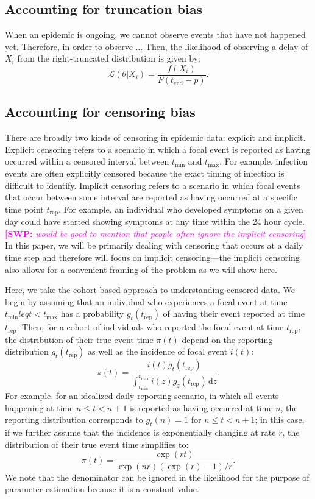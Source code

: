 \documentclass[12pt]{article}
\newcommand{\comment}{\showcomment}
\newcommand{\showcomment}[3]{\textcolor{#1}{\textbf{[#2: }\textsl{#3}\textbf{]}}}
\newcommand{\swp}[1]{\comment{magenta}{SWP}{#1}}
\newcommand{\dd}[1]{\ensuremath{\, \mathrm{d}#1}}
\newcommand{\tend}{{t_{\mathrm{end}}}}
\newcommand{\tmin}{{t_{\mathrm{min}}}}
\newcommand{\tmax}{{t_{\mathrm{max}}}}
\newcommand{\trep}{{t_{\mathrm{rep}}}}
\begin{document}
\subsection{Accounting for truncation bias}

When an epidemic is ongoing, we cannot observe events that have not happened yet.
Therefore, in order to observe ...
Then, the likelihood of observing a delay of $X_i$ from the right-truncated distribution is given by:
\begin{equation}
\mathcal L(\theta|X_i) = \frac{f(X_i)}{F(\tend-p)}.
\end{equation}

\subsection{Accounting for censoring bias}

There are broadly two kinds of censoring in epidemic data: explicit and implicit.
Explicit censoring refers to a scenario in which a focal event is reported as having occurred within a censored interval between $\tmin$ and $\tmax$.
For example, infection events are often explicitly censored because the exact timing of infection is difficult to identify.
Implicit censoring refers to a scenario in which focal events that occur between some interval are reported as having occurred at a specific time point $\trep$.
For example, an individual who developed symptoms on a given day could have started showing symptoms at any time within the 24 hour cycle.
\swp{would be good to mention that people often ignore the implicit censoring}
In this paper, we will be primarily dealing with censoring that occurs at a daily time step and therefore will focus on implicit censoring---the implicit censoring also allows for a convenient framing of the problem as we will show here.

Here, we take the cohort-based approach to understanding censored data.
We begin by assuming that an individual who experiences a focal event at time $\tmin leq t < \tmax$ has a probability $g_t(\trep)$ of having their event reported at time $\trep$.
Then, for a cohort of individuals who reported the focal event at time $\trep$, the distribution of their true event time $\pi(t)$ depend on the reporting distribution $g_t(\trep)$ as well as the incidence of focal event $i(t)$:
\begin{equation}
\pi(t) = \frac{i(t) g_t(\trep)}{\int_{\tmin}^\tmax i(z) g_z(\trep) \dd z}.
\end{equation}
For example, for an idealized daily reporting scenario, in which all events happening at time $n \leq t < n+1$ is reported as having occurred at time $n$, the reporting distribution corresponds to $g_t(n) = 1$ for $n \leq t < n+1$;
in this case, if we further assume that the incidence is exponentially changing at rate $r$, the distribution of their true event time simplifies to:
\begin{equation}
\pi(t) = \frac{\exp(rt)}{\exp(nr) (\exp(r) - 1)/r}.
\end{equation}
We note that the denominator can be ignored in the likelihood for the purpose of parameter estimation because it is a constant value.
\end{document}
